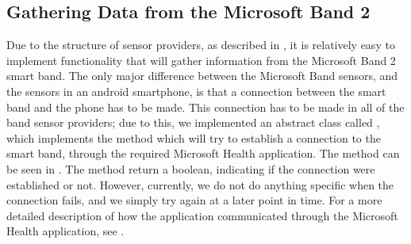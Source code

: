 \subsection{Gathering Data from the Microsoft Band 2}
Due to the structure of sensor providers, as described in , it is relatively easy to implement functionality that will gather information from the Microsoft Band 2 smart band. The only major difference between the Microsoft Band sensors, and the sensors in an android smartphone, is that a connection between the smart band and the phone has to be made. This connection has to be made in all of the band sensor providers; due to this, we implemented an abstract class called , which implements the method  which will try to establish a connection to the smart band, through the required Microsoft Health application. The method can be seen in . The method return a boolean, indicating if the connection were established or not. However, currently, we do not do anything specific when the connection fails, and we simply try again at a later point in time. For a more detailed description of how the application communicated through the Microsoft Health application, see .


\FloatBarrier
